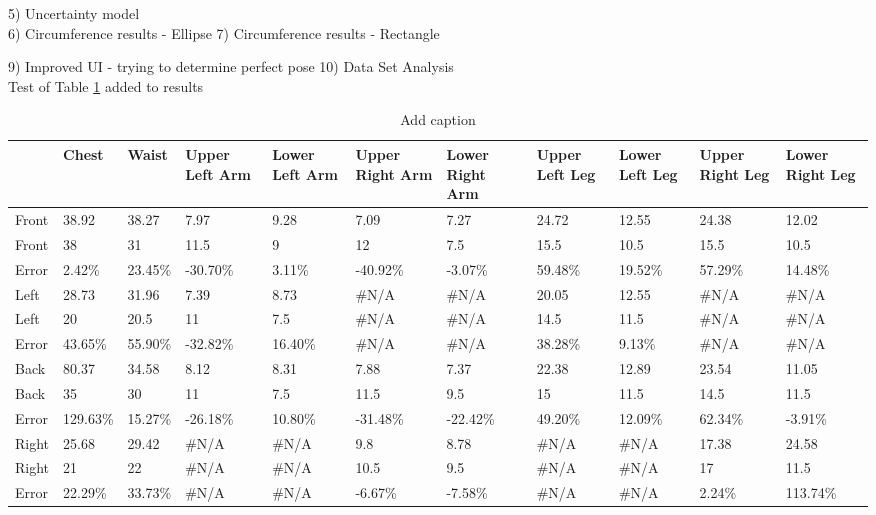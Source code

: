 5) Uncertainty model\\

6) Circumference results - Ellipse
7) Circumference results - Rectangle


9) Improved UI - trying to determine perfect pose
10) Data Set Analysis\\

Test of Table \ref{tab:testTable} added to results

\begin{table}[htbp]
	\centering
	\caption{Add caption}
	\begin{tabularx}{\textwidth}{|X|X|X|X|X|X|X|X|X|X|X|}
		\toprule
		& Chest & Waist & Upper Left Arm & Lower Left Arm & Upper Right Arm & Lower Right Arm & Upper Left Leg & Lower Left Leg & Upper Right Leg & Lower Right Leg \\
		\midrule
		\rowcolor[rgb]{ .573,  .816,  .314} Front & 38.92 & 38.27 & 7.97  & 9.28  & 7.09  & 7.27  & 24.72 & 12.55 & 24.38 & 12.02 \\
		\midrule
		\rowcolor[rgb]{ 0,  .69,  .941} Front & 38    & 31    & 11.5  & 9     & 12    & 7.5   & 15.5  & 10.5  & 15.5  & 10.5 \\
		\midrule
		Error & 2.42\% & 23.45\% & -30.70\% & 3.11\% & -40.92\% & -3.07\% & 59.48\% & 19.52\% & 57.29\% & 14.48\% \\
		\midrule
		\rowcolor[rgb]{ .573,  .816,  .314} Left  & 28.73 & 31.96 & 7.39  & 8.73  & \#N/A & \#N/A & 20.05 & 12.55 & \#N/A & \#N/A \\
		\midrule
		\rowcolor[rgb]{ 0,  .69,  .941} Left  & 20    & 20.5  & 11    & 7.5   & \#N/A & \#N/A & 14.5  & 11.5  & \#N/A & \#N/A \\
		\midrule
		Error & 43.65\% & 55.90\% & -32.82\% & 16.40\% & \#N/A & \#N/A & 38.28\% & 9.13\% & \#N/A & \#N/A \\
		\midrule
		\rowcolor[rgb]{ .573,  .816,  .314} Back  & 80.37 & 34.58 & 8.12  & 8.31  & 7.88  & 7.37  & 22.38 & 12.89 & 23.54 & 11.05 \\
		\midrule
		\rowcolor[rgb]{ 0,  .69,  .941} Back  & 35    & 30    & 11    & 7.5   & 11.5  & 9.5   & 15    & 11.5  & 14.5  & 11.5 \\
		\midrule
		Error & 129.63\% & 15.27\% & -26.18\% & 10.80\% & -31.48\% & -22.42\% & 49.20\% & 12.09\% & 62.34\% & -3.91\% \\
		\midrule
		\rowcolor[rgb]{ .573,  .816,  .314} Right & 25.68 & 29.42 & \#N/A & \#N/A & 9.8   & 8.78  & \#N/A & \#N/A & 17.38 & 24.58 \\
		\midrule
		\rowcolor[rgb]{ 0,  .69,  .941} Right & 21    & 22    & \#N/A & \#N/A & 10.5  & 9.5   & \#N/A & \#N/A & 17    & 11.5 \\
		\midrule
		Error & 22.29\% & 33.73\% & \#N/A & \#N/A & -6.67\% & -7.58\% & \#N/A & \#N/A & 2.24\% & 113.74\% \\
		\bottomrule
	\end{tabularx}%
	\label{tab:testTable}%
\end{table}%

